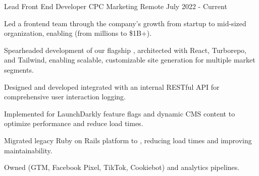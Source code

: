 \begin{cventries}


\cventry
{Lead Front End Developer} %
{CPC Marketing} %
{Remote} %
{July 2022 - Current} %
{
  \begin{cvitems} %
    \item {Led a frontend team through the company's growth from startup to mid-sized organization, enabling  (from millions to \$1B+).}
    \item {Spearheaded development of our flagship , architected with React, Turborepo, and Tailwind, enabling scalable, customizable site generation for multiple market segments.}
    \item {Designed and developed  integrated with an internal RESTful API for comprehensive user interaction logging.}
    \item {Implemented  for LaunchDarkly feature flags and dynamic CMS content to optimize performance and reduce load times.}
    \item {Migrated legacy Ruby on Rails platform to , reducing load times and improving maintainability.}
    \item {Owned  (GTM, Facebook Pixel, TikTok, Cookiebot) and analytics pipelines}.
  \end{cvitems}
}


\end{cventries}
